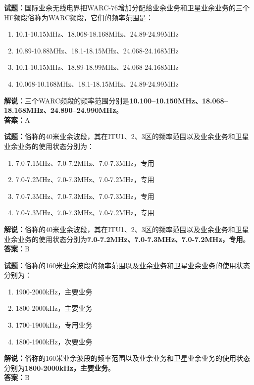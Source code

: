 \documentclass{ctexbook}
\begin{document}
\bigskip


\noindent\textbf{试题：}国际业余无线电界把WARC-76增加分配给业余业务和卫星业余业务的三个HF频段俗称为WARC频段，它们的频率范围是：
\begin{enumerate}[leftmargin=3em]
\item 10.1-10.15\unit{\MHz}、18.068-18.168\unit{\MHz}、24.89-24.99\unit{\MHz}
\item 10.89-10.88\unit{\MHz}、18.1-18.15\unit{\MHz}、24.068-24.168\unit{\MHz}
\item 10.1-10.15\unit{\MHz}、18.89-18.99\unit{\MHz}、24.068-24.168\unit{\MHz}
\item 10.068-10.168\unit{\MHz}、18.1-18.15\unit{\MHz}、24.89-24.99\unit{\MHz}
\end{enumerate}
\noindent\textbf{解说：}三个WARC频段的频率范围分别是\textbf{10.100–10.150\unit{\MHz}、18.068–18.168\unit{\MHz}、24.890–24.990\unit{\MHz}}。\\\noindent\textbf{答案：}A



\bigskip


\noindent\textbf{试题：}俗称的40米业余波段，其在ITU1、2、3区的频率范围以及业余业务和卫星业余业务的使用状态分别为：
\begin{enumerate}[leftmargin=3em]
\item 7.0-7.1\unit{\MHz}、7.0-7.2\unit{\MHz}、7.0-7.3\unit{\MHz}，专用
\item 7.0-7.2\unit{\MHz}、7.0-7.3\unit{\MHz}、7.0-7.2\unit{\MHz}，专用
\item 7.0-7.3\unit{\MHz}、7.0-7.3\unit{\MHz}、7.0-7.3\unit{\MHz}，专用
\item 7.0-7.3\unit{\MHz}、7.0-7.3\unit{\MHz}、7.0-7.2\unit{\MHz}，专用
\end{enumerate}
\noindent\textbf{解说：}俗称的40米业余波段，其在ITU1、2、3区的频率范围以及业余业务和卫星业余业务的使用状态分别为\textbf{7.0-7.2\unit{\MHz}、7.0-7.3\unit{\MHz}、7.0-7.2\unit{\MHz}，专用}。\\\noindent\textbf{答案：}B




\bigskip


\noindent\textbf{试题：}俗称的160米业余波段的频率范围以及业余业务和卫星业余业务的使用状态分别为：
\begin{enumerate}[leftmargin=3em]
\item 1900-2000\unit{\kHz}，主要业务
\item 1800-2000\unit{\kHz}，主要业务
\item 1700-1900\unit{\kHz}，专用业务
\item 1800-1900\unit{\kHz}，次要业务
\end{enumerate}
\noindent\textbf{解说：}俗称的160米业余波段的频率范围以及业余业务和卫星业余业务的使用状态分别为\textbf{1800-2000\unit{\kHz}，主要业务}。\\\noindent\textbf{答案：}B
\end{document}
